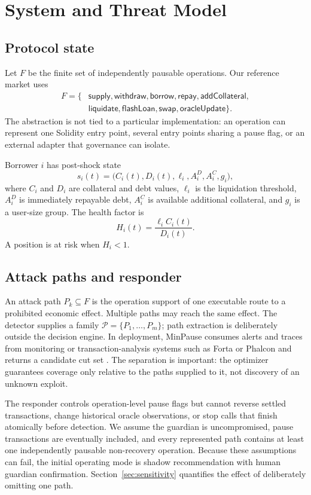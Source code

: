 \documentclass[sn-vancouver,Numbered]{sn-jnl}
\begin{document}
\section{System and Threat Model}
\subsection{Protocol state}
Let $F$ be the finite set of independently pausable operations.  Our reference market uses
\begin{align*}
F=\{&\textsf{supply},\textsf{withdraw},\textsf{borrow},\textsf{repay},
\textsf{addCollateral},\\
&\textsf{liquidate},\textsf{flashLoan},\textsf{swap},\textsf{oracleUpdate}\}.
\end{align*}
The abstraction is not tied to a particular implementation: an operation can represent one Solidity entry point, several entry points sharing a pause flag, or an external adapter that governance can isolate.

Borrower $i$ has post-shock state
\[
s_i(t)=\big(C_i(t),D_i(t),\ell_i,A_i^D,A_i^C,g_i\big),
\]
where $C_i$ and $D_i$ are collateral and debt values, $\ell_i$ is the liquidation threshold, $A_i^D$ is immediately repayable debt, $A_i^C$ is available additional collateral, and $g_i$ is a user-size group.  The health factor is
\begin{equation}
H_i(t)=\frac{\ell_i C_i(t)}{D_i(t)}.
\label{eq:hf}
\end{equation}
A position is at risk when $H_i<1$.

\subsection{Attack paths and responder}
An attack path $P_k\subseteq F$ is the operation support of one executable route to a prohibited economic effect. Multiple paths may reach the same effect. The detector supplies a family $\mathcal P=\{P_1,\ldots,P_m\}$; path extraction is deliberately outside the decision engine. In deployment, MinPause consumes alerts and traces from monitoring or transaction-analysis systems such as Forta or Phalcon and returns a candidate cut set \cite{forta2026kit,blocksec2026phalcon}. The separation is important: the optimizer guarantees coverage only relative to the paths supplied to it, not discovery of an unknown exploit.

The responder controls operation-level pause flags but cannot reverse settled transactions, change historical oracle observations, or stop calls that finish atomically before detection. We assume the guardian is uncompromised, pause transactions are eventually included, and every represented path contains at least one independently pausable non-recovery operation. Because these assumptions can fail, the initial operating mode is shadow recommendation with human guardian confirmation. Section~\ref{sec:sensitivity} quantifies the effect of deliberately omitting one path.
\end{document}
